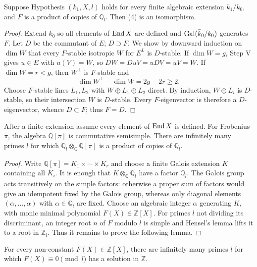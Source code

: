 \begin{proposition}[Step VI]
\label{mumford-appI-step-VI}
Suppose Hypothesis $(k_1,X,l)$ holds for every finite algebraic extension
$k_1/k_0$, and $F$ is a product of copies of $\mathbb Q_l$. Then (4) is an
isomorphism.
\end{proposition}
\begin{proof}
Extend $k_0$ so all elements of ${\rm End}\,X$ are defined and
${\rm Gal}(\bar k_0/k_0)$ generates $F$. Let $D$ be the commutant of $E$;
$D\supset F$. We show by downward induction on $\dim W$ that every
$F$-stable isotropic $W$ for $E^L$ is $D$-stable. If $\dim W=g$, Step V gives
$u\in E$ with $u(V)=W$, so $DW=DuV=uDV=uV=W$. If $\dim W=r<g$, then
$W^\perp$ is $F$-stable and
\[
 \dim W^\perp-\dim W=2g-2r\ge2.
\]
Choose $F$-stable lines $L_1,L_2$ with
$W\oplus L_1\oplus L_2$ direct. By induction, $W\oplus L_i$ is $D$-stable,
so their intersection $W$ is $D$-stable. Every $F$-eigenvector is therefore
a $D$-eigenvector, whence $D\subset F$; thus $F=D$.

\end{proof}


\begin{proposition}
\label{mumford-appI-step-VII}
After a finite extension assume every element of ${\rm End}\,X$ is defined.
For Frobenius $\pi$, the algebra $\mathbb Q[\pi]$ is commutative semisimple.
There are infinitely many primes $l$ for which
$\mathbb Q_l\otimes_{\mathbb Q}\mathbb Q[\pi]$ is a product of copies of
$\mathbb Q_l$.
\end{proposition}
\begin{proof}
Write $\mathbb Q[\pi]=K_1\times\cdots\times K_r$ and choose a finite Galois
extension $K$ containing all $K_i$. It is enough that
$K\otimes_{\mathbb Q}\mathbb Q_l$ have a factor $\mathbb Q_l$. The Galois group
acts transitively on the simple factors: otherwise a proper sum of factors
would give an idempotent fixed by the Galois group, whereas only diagonal
elements $(\alpha,\ldots,\alpha)$ with $\alpha\in\mathbb Q_l$ are fixed.
Choose an algebraic integer $\alpha$ generating $K$, with monic minimal
polynomial $F(X)\in\mathbb Z[X]$. For primes $l$ not dividing its discriminant,
an integer root $n$ of $F$ modulo $l$ is simple and Hensel's lemma lifts it to
a root in $\mathbb Z_l$. Thus it remains to prove the following lemma.

\end{proof}


\begin{lemma}
\label{mumford-lem-appI-prime-root}
For every non-constant $F(X)\in\mathbb Z[X]$, there are infinitely many primes
$l$ for which $F(X)\equiv0\pmod l$ has a solution in $\mathbb Z$.
\end{lemma}

